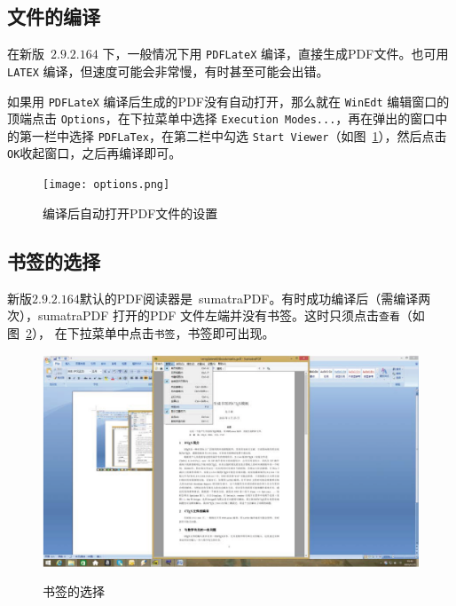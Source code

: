 \subsection{\CTeX{} 文件的编译}
在新版~\CTeX$2.9.2.164$ 下，一般情况下用{ \tt PDFLateX} 编译，直接生成PDF文件。也可用{ \tt LATEX} 编译，但速度可能会非常慢，有时甚至可能会出错。

如果用{ \tt PDFLateX} 编译后生成的PDF没有自动打开，那么就在{ \tt WinEdt} 编辑窗口的顶端点击{ \tt Options}，在下拉菜单中选择{ \tt Execution Modes...}，再在弹出的窗口中的第一栏中选择{ \tt PDFLaTex}，在第二栏中勾选{ \tt Start Viewer}（如图~\ref{fig:optionPDF}），然后点击{ \tt OK}收起窗口，之后再编译即可。
\begin{figure}
  \centering
  \texttt{[image: options.png]}\\
  \caption{编译后自动打开PDF文件的设置}\label{fig:optionPDF}
\end{figure}

\subsection{书签的选择}
新版\CTeX$2.9.2.164$默认的{\rm PDF}阅读器是~{\rm sumatraPDF}。有时成功编译后（需编译两次），{\rm sumatraPDF} 打开的{\rm PDF} 文件左端并没有书签。这时只须点击{\tt 查看}（如图~\ref{fig:bookmarkselection}），
在下拉菜单中点击{\tt 书签}，书签即可出现。
\begin{figure}
\centering
  \includegraphics[width=16cm]{codes/selectbookmarks.eps}\\
  \caption{书签的选择}\label{fig:bookmarkselection}
\end{figure}
